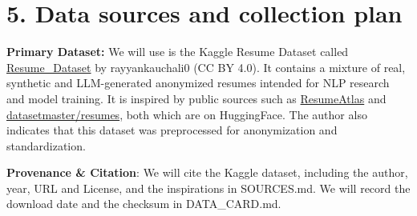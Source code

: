 \documentclass[12pt]{article}
\begin{document}
\medskip

\section*{5. Data sources and collection plan}
\textbf{Primary Dataset:} We will use is the Kaggle Resume Dataset called \href{https://www.kaggle.com/datasets/rayyankauchali0/resume-dataset?resource=download}{Resume\_Dataset} by rayyankauchali0 (CC BY 4.0).
It contains a mixture of real, synthetic and LLM-generated anonymized resumes intended for NLP research and model training. It is inspired by public sources such as \href{https://huggingface.co/collections/ahmedheakl/resumeatlas-668047e86bc332049afd0b39}{ResumeAtlas} and
\href{https://huggingface.co/datasets/datasetmaster/resumes}{datasetmaster/resumes}, both which are on HuggingFace. The author also indicates that this dataset was preprocessed for anonymization and standardization.

\noindent \textbf{Provenance \& Citation}:  We will cite the Kaggle dataset, including the author, year, URL and License, and the inspirations in SOURCES.md. We will record the download date and the checksum in DATA\_CARD.md.
\end{document}

